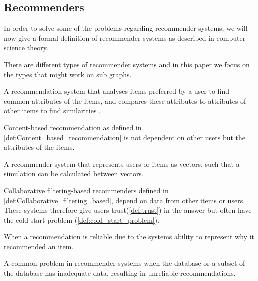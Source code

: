 \subsection{Recommenders}
In order to solve some of the problems regarding recommender systems, we will now give a formal definition of recommender systems as described in computer science theory. 

There are different types of recommender systems and in this paper we focus on the types that might work on sub graphs.

\begin{definition} \label{def:Content_based_recommendation}
A recommendation system that analyses items preferred by a user to find common attributes of the items, and compares these attributes to attributes of other items to find similarities \cite{lu2015recommender}. 
\end{definition}

Content-based recommendation as defined in  \autoref{def:Content_based_recommendation} is not dependent on other users but the attributes of the items.

\begin{definition}\label{def:Collaborative_filtering_based}
A recommender system that represents users or items as vectors, such that a simulation can be calculated between vectors\cite{lu2015recommender}.
\end{definition}

Collaborative filtering-based recommenders defined in \autoref{def:Collaborative_filtering_based}, depend on data from other items or users. These systems therefore give users trust(\autoref{def:trust}) in the answer but often have the cold start problem (\autoref{def:cold_start_problem}).

\begin{definition}[Trust]\label{def:trust}
When a recommendation is reliable due to the systems ability to represent why it recommended an item\cite{Ricci2015}.
\end{definition}

\begin{definition}\label{def:cold_start_problem}
A common problem in recommender systems when the database or a subset of the database has inadequate data, resulting in unreliable recommendations\cite{Ricci2015}.
\end{definition}

